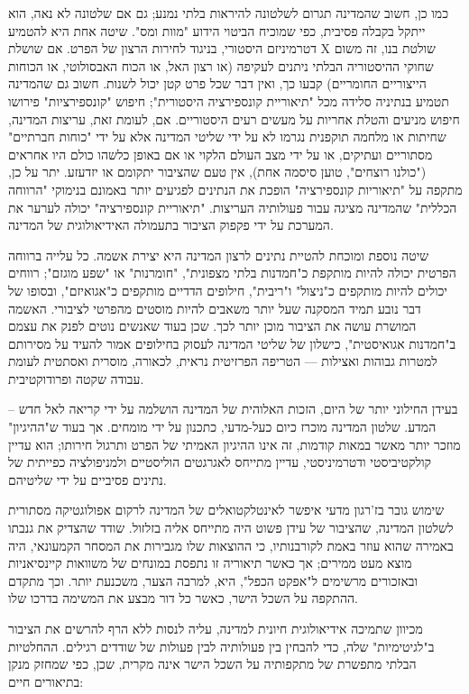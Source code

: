 \documentclass[10pt,oneside]{book}
\begin{document}
כמו כן, חשוב שהמדינה תגרום לשלטונה להיראות בלתי נמנע; גם אם שלטונה לא נאה, הוא ייתקל בקבלה פסיבית, כפי שמוכיח הביטוי הידוע "מוות ומס". שיטה אחת היא להטמיע דטרמיניזם היסטורי, בניגוד לחירות הרצון של הפרט. אם שושלת X שולטת בנו, זה משום שחוקי ההיסטוריה הבלתי ניתנים לעקיפה (או רצון האל, או הכוח האבסולוטי, או הכוחות הייצוריים החומריים) קבעו כך, ואין דבר שכל פרט קטן יכול לשנות. חשוב גם שהמדינה תטמיע בנתיניה סלידה מכל "תיאוריית קונספירציה היסטורית"; חיפוש "קונספירציות" פירושו חיפוש מניעים והטלת אחריות על מעשים רעים היסטוריים. אם, לעומת זאת, עריצות המדינה, שחיתות או מלחמה תוקפנית נגרמו לא על ידי שליטי המדינה אלא על ידי "כוחות חברתיים" מסתוריים ועתיקים, או על ידי מצב העולם הלקוי או אם באופן כלשהו כולם היו אחראים ("כולנו רוצחים", טוען סיסמה אחת), אין טעם שהציבור יתקומם או יזדעזע. יתר על כן, מתקפה על "תיאוריות קונספירציה" הופכת את הנתינים לפגיעים יותר באמונם בנימוקי "הרווחה הכללית" שהמדינה מציגה עבור פעולותיה העריצות. "תיאוריית קונספירציה" יכולה לערער את המערכת על ידי פקפוק הציבור בתעמולה האידיאולוגית של המדינה.

שיטה נוספת ומוכחת להטיית נתינים לרצון המדינה היא יצירת אשמה. כל עלייה ברווחה הפרטית יכולה להיות מותקפת כ"חמדנות בלתי מצפונית", "חומרנות" או "שפע מוגזם"; רווחים יכולים להיות מותקפים כ"ניצול" ו"ריבית", חילופים הדדיים מותקפים כ"אגואיזם", ובסופו של דבר נובע תמיד המסקנה שעל יותר משאבים להיות מוסטים מהפרטי לציבורי. האשמה המושרת עושה את הציבור מוכן יותר לכך. שכן בעוד שאנשים נוטים לפנק את עצמם ב"חמדנות אגואיסטית", כישלון של שליטי המדינה לעסוק בחילופים אמור להעיד על מסירותם למטרות גבוהות ואצילות — הטריפה הפרזיטית נראית, לכאורה, מוסרית ואסתטית לעומת עבודה שקטה ופרודוקטיבית.

בעידן החילוני יותר של היום, הזכות האלוהית של המדינה הושלמה על ידי קריאה לאל חדש – המדע. שלטון המדינה מוכרז כיום כעל-מדעי, כתכנון על ידי מומחים. אך בעוד ש"ההיגיון" מוזכר יותר מאשר במאות קודמות, זה אינו ההיגיון האמיתי של הפרט ותרגול חירותו; הוא עדיין קולקטיביסטי ודטרמיניסטי, עדיין מתייחס לאגרגטים הוליסטיים ולמניפולציה כפייתית של נתינים פסיביים על ידי שליטיהם.

שימוש גובר בז'רגון מדעי איפשר לאינטלקטואלים של המדינה לרקום אפולוגטיקה מסתורית לשלטון המדינה, שהציבור של עידן פשוט היה מתייחס אליה בזלזול. שודד שהצדיק את גנבתו באמירה שהוא עוזר באמת לקורבנותיו, כי ההוצאות שלו מגבירות את המסחר הקמעונאי, היה מוצא מעט ממירים; אך כאשר תיאוריה זו נתפסת במונחים של משוואות קיינסיאניות ובאזכורים מרשימים ל"אפקט הכפל", היא, למרבה הצער, משכנעת יותר. וכך מתקדם ההתקפה על השכל הישר, כאשר כל דור מבצע את המשימה בדרכו שלו.

מכיוון שתמיכה אידיאולוגית חיונית למדינה, עליה לנסות ללא הרף להרשים את הציבור ב"לגיטימיות" שלה, כדי להבחין בין פעולותיה לבין פעולות של שודדים רגילים. ההחלטיות הבלתי מתפשרת של מתקפותיה על השכל הישר אינה מקרית, שכן, כפי שמחזק מנקן בתיאורים חיים: \\
\end{document}
